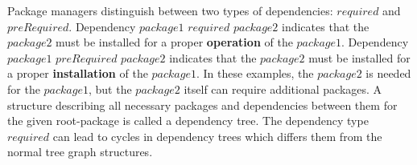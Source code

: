 Package managers distinguish between two types of dependencies: $required$ and $preRequired$. %
Dependency $package1$ \textbf{$required$} $package2$ indicates that the $package2$ must be installed for a proper \textbf{operation} of the $package1$. %
Dependency $package1$ \textbf{$preRequired$} $package2$ indicates that the $package2$ must be installed for a proper \textbf{installation} of the $package1$. %
In these examples, the $package2$ is needed for the $package1$, but the $package2$ itself can require additional packages.
A structure describing all necessary packages and dependencies between them for the given root-package is called a dependency tree. 
The dependency type $required$ can lead to cycles in dependency trees which differs them from the normal tree graph structures.

